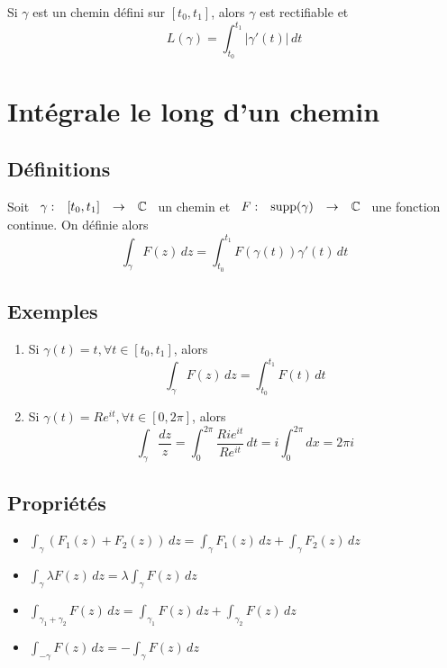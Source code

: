 \documentclass[]{report}
\begin{document}
\begin{prop}{}{}
    Si $\gamma$ est un chemin défini sur $[t_0,t_1]$, alors $\gamma$ est rectifiable et $$L(\gamma)=\int_{t_0}^{t_1} |\gamma'(t)| \,dt$$
\end{prop}

\section{Intégrale le long d'un chemin}

\subsection{Définitions}

Soit $\begin{array}{ccccc}
\gamma : & [t_0,t_1] & \to & \mathbb{C}
\end{array}$ un chemin et $\begin{array}{ccccc}
F : & \text{supp}(\gamma) & \to & \mathbb{C}
\end{array}$ une fonction continue. On définie alors $$\int_{\gamma} F(z) \,dz=\int_{t_0}^{t_1} F(\gamma(t))\gamma'(t) \,dt$$

\subsection{Exemples}

\begin{enumerate}
    \item Si $\gamma(t)=t,\forall t\in [t_0,t_1]$, alors $$\int_{\gamma} F(z) \,dz=\int_{t_0}^{t_1} F(t) \,dt$$
    \item Si $\gamma(t)=Re^{it},\forall t\in[0,2\pi]$, alors $$\int_{\gamma}\frac{dz}{z}=\int_{0}^{2\pi} \frac{Rie^{it}}{Re^{it}} \,dt=i\int_{0}^{2\pi} dx=2\pi i$$
\end{enumerate}

\subsection{Propriétés}

\begin{itemize}
    \item $\int_{\gamma} (F_1(z) +F_2(z))\,dz=\int_{\gamma} F_1(z) \,dz+\int_{\gamma} F_2(z) \,dz$
    \item $\int_{\gamma} \lambda F(z) \,dz=\lambda\int_{\gamma} F(z) \,dz$
    \item $\int_{\gamma_1+\gamma_2} F(z) \,dz=\int_{\gamma_1} F(z) \,dz+\int_{\gamma_2} F(z) \,dz$
    \item $\int_{-\gamma} F(z) \,dz=-\int_{\gamma} F(z) \,dz$
\end{itemize}
\end{document}
